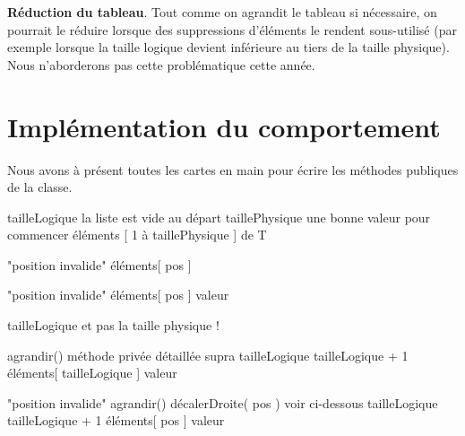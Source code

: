 \bigskip

\textbf{Réduction du tableau}. Tout comme on agrandit le tableau si
nécessaire, on pourrait le réduire lorsque des suppressions d’éléments
le rendent sous-utilisé (par exemple lorsque la taille logique devient
inférieure au tiers de la taille physique). 
Nous n'aborderons pas cette problématique cette année.


\section{Implémentation du comportement}

Nous avons à présent toutes les cartes en main pour écrire les méthodes
publiques de la classe.

\begin{Pseudocode}
		\Let tailleLogique 
		\RComment la liste est vide au départ
		\Let taillePhysique 
		\RComment une bonne valeur pour commencer
		\Let éléments \Gets {}  [ 1 à taillePhysique ] de T
	\EndConstr
\end{Pseudocode}

\begin{Pseudocode}
			\Error "position invalide"
		\EndIf
		\Return éléments[ pos ]
	\EndMethod
\end{Pseudocode}

\begin{Pseudocode}
			\Error "position invalide"
		\EndIf
		\Let éléments[ pos ] \Gets valeur
	\EndMethod
\end{Pseudocode}

\begin{Pseudocode}
		\Return tailleLogique
		\RComment et pas la taille physique !
	\EndMethod
\end{Pseudocode}

\begin{Pseudocode}
			\Stmt agrandir()
			\RComment méthode privée détaillée supra
		\EndIf
		\Let tailleLogique \Gets tailleLogique + 1
		\Let éléments[ tailleLogique ] \Gets valeur
	\EndMethod
\end{Pseudocode}

\begin{Pseudocode}
			\Error "position invalide"
		\EndIf
			\Stmt agrandir()
		\EndIf
		\Stmt décalerDroite( pos )
		\RComment voir ci-dessous
		\Let tailleLogique \Gets tailleLogique + 1
		\Let éléments[ pos ] \Gets valeur
	\EndMethod
\end{Pseudocode}

